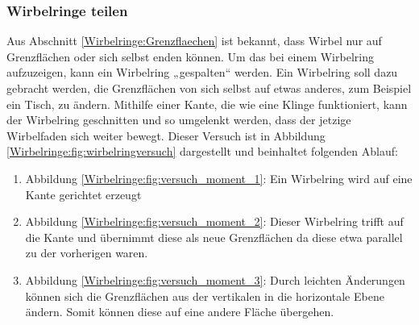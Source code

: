 \subsubsection{Wirbelringe teilen}

Aus Abschnitt \ref{Wirbelringe:Grenzflaechen} ist bekannt, dass Wirbel nur auf Grenzflächen oder sich selbst enden können. 
Um das bei einem Wirbelring aufzuzeigen, kann ein Wirbelring „gespalten“ werden. 
Ein Wirbelring soll dazu gebracht werden, die Grenzflächen von sich selbst auf etwas anderes, zum Beispiel ein Tisch, zu ändern. 
Mithilfe einer Kante, die wie eine Klinge funktioniert, kann der Wirbelring geschnitten und so umgelenkt werden, dass der jetzige Wirbelfaden sich weiter bewegt. 
Dieser Versuch ist in Abbildung \ref{Wirbelringe:fig:wirbelringversuch} dargestellt und beinhaltet folgenden Ablauf:



\begin{enumerate}
    \item Abbildung \ref{Wirbelringe:fig:versuch_moment_1}: Ein Wirbelring wird auf eine Kante gerichtet erzeugt
    \item Abbildung \ref{Wirbelringe:fig:versuch_moment_2}: Dieser Wirbelring trifft auf die Kante und übernimmt diese als neue Grenzflächen da diese etwa parallel zu der vorherigen waren.
    \item Abbildung \ref{Wirbelringe:fig:versuch_moment_3}: Durch leichten Änderungen können sich die Grenzflächen aus der vertikalen in die horizontale Ebene ändern.
    Somit können diese auf eine andere Fläche übergehen.
\end{enumerate}
    
